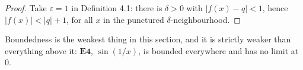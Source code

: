 \begin{proof}
Take $\varepsilon = 1$ in Definition 4.1: there is $\delta>0$ with
$|f(x)-q|<1$, hence $|f(x)| < |q|+1$, for all $x$ in the punctured
$\delta$-neighbourhood.
\end{proof}

\noindent
Boundedness is the weakest thing in this section, and it is strictly weaker
than everything above it: $\mathbf{E4}$, $\sin(1/x)$, is bounded everywhere
and has no limit at $0$.
